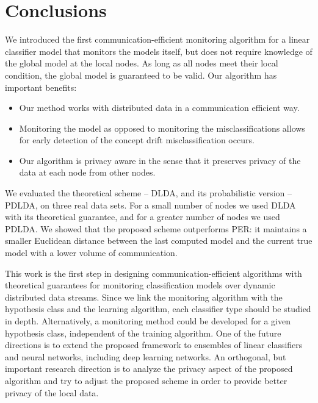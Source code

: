\section*{Conclusions}
We introduced the first communication-efficient monitoring algorithm for a linear classifier model that monitors the
models itself, but does not require knowledge of the global model at the local nodes.
As long as all nodes meet their local condition, the
global model is guaranteed to be valid. Our algorithm has important benefits:
\begin{itemize}
  \item Our method works with distributed data in a communication efficient way.
  \item Monitoring the model as opposed to monitoring the misclassifications allows for early detection of the concept drift misclassification occurs.
  \item Our algorithm is privacy aware in the sense that it preserves privacy of the data at each node from other nodes.
\end{itemize}

We evaluated the theoretical scheme -- DLDA,  and its probabilistic version -- PDLDA, on three real data sets.
For a small number of nodes we used DLDA with its theoretical guarantee, and for a greater number of nodes we used
PDLDA. We showed that the proposed scheme outperforms PER: it maintains a smaller Euclidean distance between
the last computed model and the current true model with a lower volume of communication.

This work is the first step in designing communication-efficient algorithms
with theoretical guarantees for monitoring classification models over dynamic distributed data
streams. 
Since we link the monitoring algorithm with the
hypothesis class and the learning algorithm, each classifier type should be
studied in depth.
Alternatively, a monitoring method could be developed for a given
hypothesis class, independent of the training algorithm.
One of the future directions is to extend the proposed framework to
ensembles of linear classifiers and neural networks, including deep learning networks.
An orthogonal, but important research direction is to analyze the
privacy aspect of the proposed algorithm and try to adjust the proposed
scheme in order to provide better privacy of the local data.

\nocite{*}


